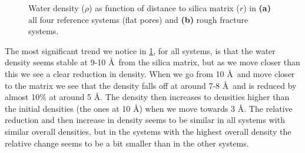 \begin{figure}[!htb]%
    \setlength{\myfigwidth}{0.58\textwidth}%
    \vspace{8pt}%
    \caption{%
        Water density ($\rho$) as function of distance to silica matrix ($r$) in \textbf{(a)} all four reference systems (flat pores) and \textbf{(b)} rough fracture systems.%
        \label{fig:first_density_fig}%
    }%
\end{figure}%

The most significant trend we notice in \cref{fig:first_density_fig}, for all systems, is that the water density seems stable at 9-10 \AA\ from the silica matrix, but as we move closer than this we see a clear reduction in density. When we go from 10 \AA\ and move closer to the matrix we see that the density falls off at around 7-8 \AA\, and is reduced by almost 10\% at around 5 \AA. The density then increases to densities higher than the initial densities (the ones at 10 \AA) when we move towards 3 \AA. The relative reduction and then increase in density seems to be similar in all systems with similar overall densities, but in the systems with the highest overall density the relative change seems to be a bit smaller than in the other systems.

